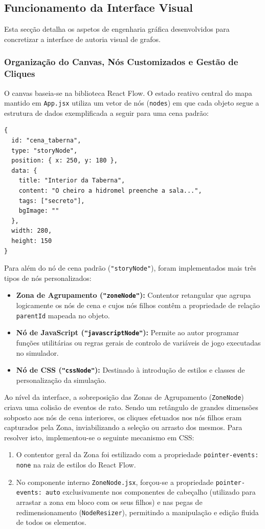 \subsection{Funcionamento da Interface Visual}
\label{subsec:camada-interface}

Esta secção detalha os aspetos de engenharia gráfica desenvolvidos para concretizar a interface de autoria visual de grafos.

\subsubsection{Organização do Canvas, Nós Customizados e Gestão de Cliques}
O canvas baseia-se na biblioteca React Flow. O estado reativo central do mapa mantido em \texttt{App.jsx} utiliza um vetor de nós (\texttt{nodes}) em que cada objeto segue a estrutura de dados exemplificada a seguir para uma cena padrão:
\begin{verbatim}
{
  id: "cena_taberna",
  type: "storyNode",
  position: { x: 250, y: 180 },
  data: {
    title: "Interior da Taberna",
    content: "O cheiro a hidromel preenche a sala...",
    tags: ["secreto"],
    bgImage: ""
  },
  width: 280,
  height: 150
}
\end{verbatim}

Para além do nó de cena padrão (\texttt{"storyNode"}), foram implementados mais três tipos de nós personalizados:
\begin{itemize}
    \item \textbf{Zona de Agrupamento (\texttt{"zoneNode"}):} Contentor retangular que agrupa logicamente os nós de cena e cujos nós filhos contêm a propriedade de relação \texttt{parentId} mapeada no objeto.
    \item \textbf{Nó de JavaScript (\texttt{"javascriptNode"}):} Permite ao autor programar funções utilitárias ou regras gerais de controlo de variáveis de jogo executadas no simulador.
    \item \textbf{Nó de CSS (\texttt{"cssNode"}):} Destinado à introdução de estilos e classes de personalização da simulação.
\end{itemize}

Ao nível da interface, a sobreposição das Zonas de Agrupamento (\texttt{ZoneNode}) criava uma colisão de eventos de rato. Sendo um retângulo de grandes dimensões sobposto aos nós de cena interiores, os cliques efetuados nos nós filhos eram capturados pela Zona, inviabilizando a seleção ou arrasto dos mesmos. Para resolver isto, implementou-se o seguinte mecanismo em CSS:
\begin{enumerate}
    \item O contentor geral da Zona foi estilizado com a propriedade \texttt{pointer-events: none} na raiz de estilos do React Flow.
    \item No componente interno \texttt{ZoneNode.jsx}, forçou-se a propriedade \texttt{pointer-events: auto} exclusivamente nos componentes de cabeçalho (utilizado para arrastar a zona em bloco com os seus filhos) e nas pegas de redimensionamento (\texttt{NodeResizer}), permitindo a manipulação e edição fluida de todos os elementos.
\end{enumerate}

